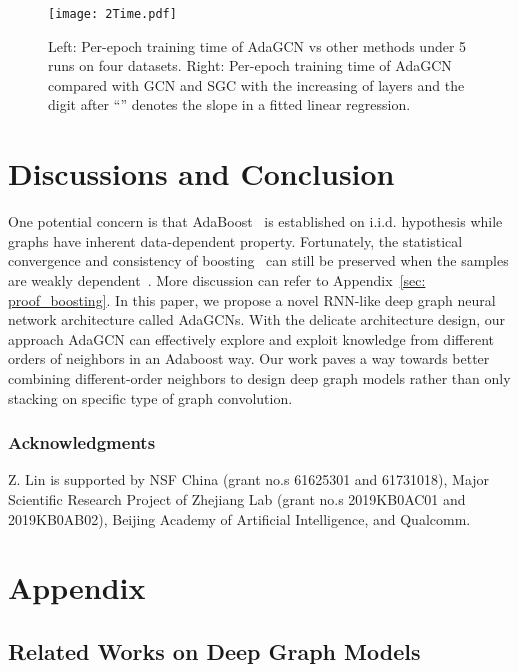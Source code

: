 \documentclass{article} \usepackage{iclr2021_conference,times}
\begin{document}
\begin{figure}[t!]
\centering
	\texttt{[image: 2Time.pdf]}
	\caption{Left: Per-epoch training time of AdaGCN vs other methods under 5 runs on four datasets. Right: Per-epoch training time of AdaGCN compared with GCN and SGC with the increasing of layers and the digit after ``'' denotes the slope in a fitted linear regression.}
	\label{figure_time}
\end{figure}

\section{Discussions and Conclusion} 


One potential concern is that AdaBoost~\citep{hastie2009multi,freund1999short} is established on i.i.d. hypothesis while graphs have inherent data-dependent property. Fortunately, the statistical convergence and consistency of boosting~\citep{lugosi2001bayes,mannor2003greedy} can still be preserved when the samples are weakly dependent~\citep{lozano2013convergence}. More discussion can refer to  Appendix~\ref{sec: proof_boosting}. In this paper, we propose a novel RNN-like deep graph neural network architecture called AdaGCNs. With the delicate architecture design, our approach AdaGCN can effectively explore and exploit knowledge from different orders of neighbors in an Adaboost way. Our work paves a way towards better combining different-order neighbors to design deep graph models rather than only stacking on specific type of graph convolution.


\subsubsection*{Acknowledgments}
Z. Lin is supported by NSF China (grant no.s 61625301 and 61731018), Major Scientific Research Project of Zhejiang Lab (grant no.s 2019KB0AC01 and 2019KB0AB02), Beijing Academy of Artificial Intelligence, and Qualcomm. 





\clearpage

\small
\appendix

\section{Appendix}
\subsection{Related Works on Deep Graph Models}\label{appendix:deep graph}
\end{document}
